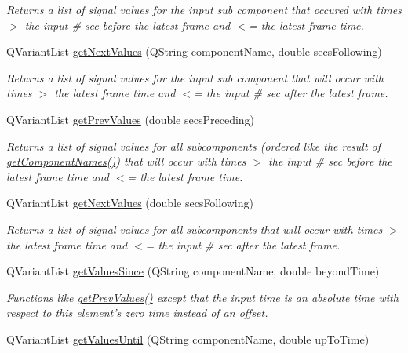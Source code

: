 \begin{DoxyCompactItemize}
\begin{DoxyCompactList}\small\item\em Returns a list of signal values for the input sub component that occured with times $>$ the input \# sec before the latest frame and $<$= the latest frame time. \end{DoxyCompactList}\item 
Q\-Variant\-List \hyperlink{class_picto_1_1_analysis_signal_data_ae3340eeed23a62f60a2e51e324c69def}{get\-Next\-Values} (Q\-String component\-Name, double secs\-Following)
\begin{DoxyCompactList}\small\item\em Returns a list of signal values for the input sub component that will occur with times $>$ the latest frame time and $<$= the input \# sec after the latest frame. \end{DoxyCompactList}\item 
Q\-Variant\-List \hyperlink{class_picto_1_1_analysis_signal_data_ab8e6e16d5e97e4fe4aaa4d6e4d1b2871}{get\-Prev\-Values} (double secs\-Preceding)
\begin{DoxyCompactList}\small\item\em Returns a list of signal values for all subcomponents (ordered like the result of \hyperlink{class_picto_1_1_analysis_signal_data_af57ef0d6d246b5dc7f5d9b9419123181}{get\-Component\-Names()}) that will occur with times $>$ the input \# sec before the latest frame time and $<$= the latest frame time. \end{DoxyCompactList}\item 
Q\-Variant\-List \hyperlink{class_picto_1_1_analysis_signal_data_ad837c2bdea6b783bf6cdb6b432d7abeb}{get\-Next\-Values} (double secs\-Following)
\begin{DoxyCompactList}\small\item\em Returns a list of signal values for all subcomponents that will occur with times $>$ the latest frame time and $<$= the input \# sec after the latest frame. \end{DoxyCompactList}\item 
\hypertarget{class_picto_1_1_analysis_signal_data_a73b8ff21df1c635f44581a1ab4efc3e7}{Q\-Variant\-List \hyperlink{class_picto_1_1_analysis_signal_data_a73b8ff21df1c635f44581a1ab4efc3e7}{get\-Values\-Since} (Q\-String component\-Name, double beyond\-Time)}\label{class_picto_1_1_analysis_signal_data_a73b8ff21df1c635f44581a1ab4efc3e7}

\begin{DoxyCompactList}\small\item\em Functions like \hyperlink{class_picto_1_1_analysis_signal_data_a5531db7f4dffd88f6a95feb3d5e093e9}{get\-Prev\-Values()} except that the input time is an absolute time with respect to this element's zero time instead of an offset. \end{DoxyCompactList}\item 
\hypertarget{class_picto_1_1_analysis_signal_data_a2e4b921b2946722b7926d90a108d38eb}{Q\-Variant\-List \hyperlink{class_picto_1_1_analysis_signal_data_a2e4b921b2946722b7926d90a108d38eb}{get\-Values\-Until} (Q\-String component\-Name, double up\-To\-Time)}\label{class_picto_1_1_analysis_signal_data_a2e4b921b2946722b7926d90a108d38eb}


\end{DoxyCompactItemize}
